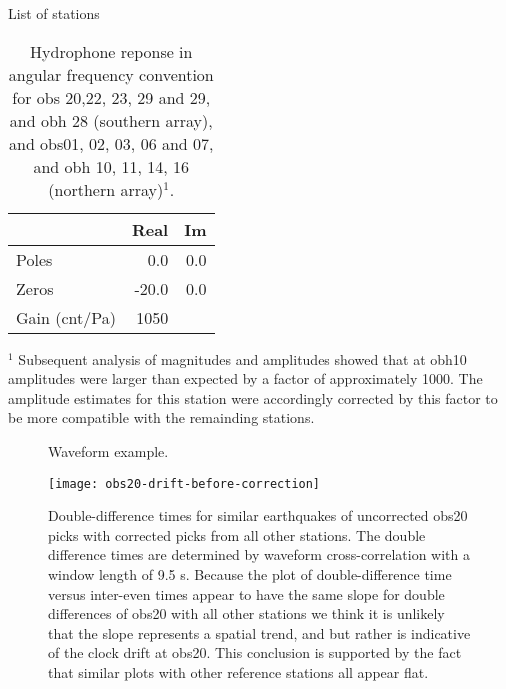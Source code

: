 \documentclass[reviewcopy]{elsarticle}
\renewcommand{\includegraphics}[2][]{\fbox{#2}}
\begin{document}
\begin{table}
\caption{List of stations}
\end{table}

\begin{table}
\caption{Hydrophone reponse in angular frequency convention for obs
  20,22, 23, 29 and 29, and obh 28 (southern array), and obs01, 02,
  03, 06 and 07, and obh 10, 11, 14, 16 (northern array)$^1$. }
\label{tbl:hyd-response}
\begin{center}
\begin{tabular}{lrr}
\hline
 & Real  & Im \\
\hline
Poles & 0.0   & 0.0 \\
Zeros & -20.0 & 0.0 \\
Gain (cnt/Pa) & 1050 &
\end{tabular}
\end{center}
\footnotesize
$^1$ Subsequent analysis of magnitudes and amplitudes showed that at obh10 amplitudes
were larger than expected by a factor of approximately 1000.  The
amplitude estimates for this station were accordingly corrected by
this factor to be more compatible with the remainding stations.
\end{table}

\begin{figure}
\centering
\caption{Waveform example.}
\label{figa:waveform}
\end{figure}


\begin{figure}
\centering
\texttt{[image: obs20-drift-before-correction]}
\caption{Double-difference times for similar earthquakes of uncorrected obs20 picks
with corrected picks from all other stations.  The double difference
times are determined by waveform cross-correlation with a window
length of 9.5 s.  Because the plot of double-difference time versus
inter-even times appear to have the same slope for double differences
of obs20 with all other stations we think it is unlikely that the slope
represents a spatial trend, and but rather is indicative of the clock
drift at obs20.  This conclusion is
supported by the fact that similar plots with other reference stations
all appear flat.}
\label{figa:obs20timing}
\end{figure}


\begin{figure}
\centering
\caption{}
\label{}
\end{figure}


\end{document}
